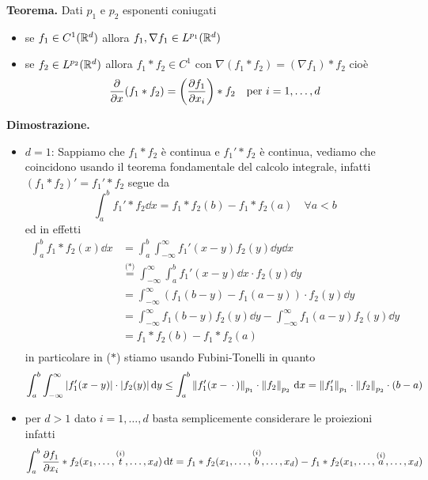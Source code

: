 \documentclass[a4paper, 12pt]{report}
\begin{document}
\textbf{Teorema.}
Dati $p_1$ e $p_2$ esponenti coniugati
\begin{itemize}
	\item se $f_1 \in C^1(\mathbb R^d)$ allora $f_1, \nabla f_1 \in L^{p_1}(\mathbb R^d)$

	\item se $f_2 \in L^{p_2}(\mathbb R^d)$ allora $f_1 \ast f_2 \in C^1$ con $\nabla(f_1 \ast f_2) = (\nabla f_1) \ast f_2$ cioè
		$$
		\frac{\partial}{\partial x}(f_1 \ast f_2) = \left( \frac{\partial f_1}{\partial x_i} \right) \ast f_2 
		\quad
		\text{per } i = 1, \dots, d
		$$

\end{itemize}

\textbf{Dimostrazione.}
\begin{itemize}
	\item $d = 1$:
		Sappiamo che $f_1 \ast f_2$ è continua e $f_1' \ast f_2$ è continua, vediamo che coincidono usando il teorema fondamentale del calcolo integrale, infatti $(f_1 \ast f_2)' = f_1' \ast f_2$ segue da
		$$
		\int_a^b f_1' \ast f_2 \dd x = f_1 \ast f_2(b) - f_1 \ast f_2(a)
		\quad \forall a < b
		$$
		ed in effetti
		$$
		\begin{aligned}
			\int_a^b f_1 \ast f_2 (x) \dd x
			&= \int_a^b \int_{-\infty}^\infty f_1'(x - y) f_2(y) \dd y \dd x \\
			&\overset{\text{($*$)}}{=} \int_{-\infty}^\infty \int_a^b f_1'(x - y) \dd x \cdot f_2(y) \dd y \\
			&= \int_{-\infty}^\infty (f_1(b - y) - f_1(a - y)) \cdot f_2(y) \dd y \\
			&= \int_{-\infty}^\infty f_1(b - y) f_2(y) \dd y - \int_{-\infty}^\infty f_1(a - y) f_2(y) \dd y \\
			&= f_1 \ast f_2(b) - f_1 \ast f_2(a) \\
		\end{aligned}
		$$
		in particolare in ($*$) stiamo usando Fubini-Tonelli in quanto
		$$
		\int_a^b \int_{-\infty}^\infty |f_1'(x-y)| \cdot |f_2(y)| \,\mathrm{d} y
		\leq \int_a^b \left\lVert f_1'(x - \,\cdot\,) \right\rVert_{p_1} \cdot \left\lVert f_2 \right\rVert_{p_2} \,\mathrm{d} x 
		= \left\lVert f_1' \right\rVert_{p_1} \cdot \left\lVert f_2 \right\rVert_{p_2} \cdot (b - a)
		$$

	\item
		per $d > 1$ dato $i = 1, \dots, d$ basta semplicemente considerare le proiezioni infatti
		$$
		\int_a^b \frac{\partial f_1}{\partial x_i} \ast f_2 (x_1, \dots, \overset{\text{($i$)}}{t}, \dots, x_d) \,\mathrm{d} t
		= f_1 \ast f_2 (x_1, \dots, \overset{\text{($i$)}}{b}, \dots, x_d) - f_1 \ast f_2 (x_1, \dots, \overset{\text{($i$)}}{a}, \dots, x_d)
		$$
\end{itemize}
\end{document}
